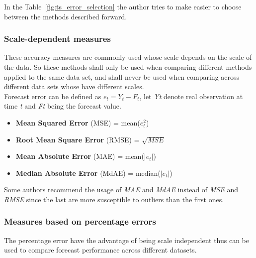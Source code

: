 In the Table~\ref{fig:ts_error_selection} the author tries to make easier to
choose between the methods described forward.

\subsubsection{Scale-dependent measures}

These accuracy measures are commonly used whose scale depends on the scale of
the data. So these methods shall only be used when comparing different methods
applied to the same data set, and shall never be used when comparing across
different data sets whose have different scales.
\\

Forecast error can be defined as \begin{math} e_t = Y_t - F_t \end{math}, let
\emph{Yt} denote real observation at time \emph{t} and \emph{Ft} being the
forecast value.
\begin{itemize}
  \item \textbf{Mean Squared Error} (MSE) = mean(\begin{math} e_t^2 \end{math})
    \item \textbf{Root Mean Square Error} (RMSE) = \begin{math}
      \sqrt{MSE}\end{math}
  \item \textbf{Mean Absolute Error} (MAE) = mean(\begin{math}
      \left|e_t\right|\end{math})
  \item \textbf{Median Absolute Error} (MdAE) = median(\begin{math}
      \left|e_t\right|\end{math})

\end{itemize}

Some authors \cite{Armstrong:2001fj} recommend the usage of \emph{MAE} and
\emph{MdAE} instead of \emph{MSE} and \emph{RMSE} since the last are more
susceptible to outliers than the first ones.


\subsubsection{Measures based on percentage errors}

The percentage error have the advantage of being scale independent thus can be
used to compare forecast performance across different datasets.

